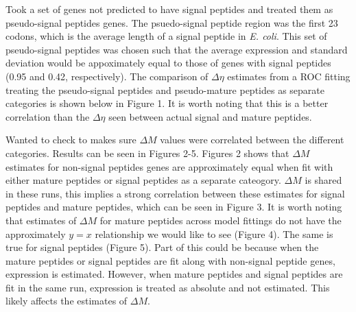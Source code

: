 \documentclass[11pt]{labbook}
\begin{document}
Took a set of genes not predicted to have signal peptides and treated them as pseudo-signal peptides genes. The psuedo-signal peptide region was the first 23 codons, which is the average length of a signal peptide in \textit{E. coli}. This set of pseudo-signal peptides was chosen such that the average expression and standard deviation would be appoximately equal to those of genes with signal peptides (0.95 and 0.42, respectively). The comparison of $\Delta\eta$ estimates from a ROC fitting treating the pseudo-signal peptides and pseudo-mature peptides as separate categories is shown below in Figure 1. It is worth noting that this is a better correlation than the $\Delta\eta$ seen between actual signal and mature peptides.



Wanted to check to makes sure $\Delta\mathit{M}$ values were correlated between the different categories. Results can be seen in Figures 2-5. Figures 2 shows that $\Delta\mathit{M}$ estimates for non-signal peptides genes are approximately equal when fit with either mature peptides or signal peptides as a separate cateogory. $\Delta\mathit{M}$ is shared in these runs, this implies a strong correlation between these estimates for signal peptides and mature peptides, which can be seen in Figure 3. It is worth noting that estimates of $\Delta\mathit{M}$ for mature peptides across model fittings do not have the approximately $y = x$ relationship we would like to see (Figure 4). The same is true for signal peptides (Figure 5). Part of this could be because when the mature peptides or signal peptides are fit along with non-signal peptide genes, expression is estimated. However, when mature peptides and signal peptides are fit in the same run, expression is treated as absolute and not estimated. This likely affects the estimates of $\Delta\mathit{M}$.
\end{document}
